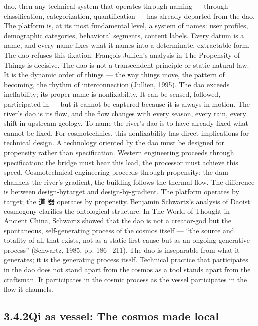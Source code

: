 dao, then any technical system that operates through naming — through classification, categorization, quantification — has already departed from the dao. The platform is, at its most fundamental level, a system of names: user profiles, demographic categories, behavioral segments, content labels. Every datum is a name, and every name fixes what it names into a determinate, extractable form. The dao refuses this fixation. François Jullien’s analysis in The Propensity of Things is decisive. The dao is not a transcendent principle or static natural law. It is the dynamic order of things — the way things move, the pattern of becoming, the rhythm of interconnection (Jullien, 1995). The dao exceeds ineffability; its proper name is nonfixability. It can be sensed, followed, participated in — but it cannot be captured because it is always in motion. The river’s dao is its flow, and the flow changes with every season, every rain, every shift in upstream geology. To name the river’s dao is to have already fixed what cannot be fixed. For cosmotechnics, this nonfixability has direct implications for technical design. A technology oriented by the dao must be designed for propensity rather than specification. Western engineering proceeds through specification: the bridge must bear this load, the processor must achieve this speed. Cosmotechnical engineering proceeds through propensity: the dam channels the river’s gradient, the building follows the thermal flow. The difference is between design-bytarget and design-by-gradient. The platform operates by target; the 道 器 operates by propensity. Benjamin Schwartz’s analysis of Daoist cosmogony clarifies the ontological structure. In The World of Thought in Ancient China, Schwartz showed that the dao is not a creator-god but the spontaneous, self-generating process of the cosmos itself — “the source and totality of all that exists, not as a static first cause but as an ongoing generative process” (Schwartz, 1985, pp. 186– 211). The dao is inseparable from what it generates; it is the generating process itself. Technical practice that participates in the dao does not stand apart from the cosmos as a tool stands apart from the craftsman. It participates in the cosmic process as the vessel participates in the flow it channels.

\subsection{3.4.2\quad Qi as vessel: The cosmos made local}

